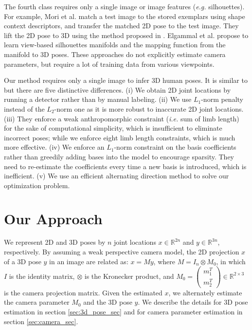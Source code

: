 \documentclass[10pt,twocolumn,letterpaper]{article}
\begin{document}
The fourth class \cite{mori2006recovering} \cite{elgammal2004inferring} requires only a single image or image features ({\it e.g.} silhouettes). For example, Mori et al. \cite{mori2006recovering} match a test image to the stored exemplars using shape context descriptors, and transfer the matched 2D pose to the test image. They lift the 2D pose to 3D using the method proposed in \cite{Taylor}. Elgammal et al.\cite{elgammal2004inferring} propose to learn view-based silhouettes manifolds and the mapping function from the manifold to 3D poses. These approaches do not explicitly estimate camera parameters, but require a lot of training data from various viewpoints.

Our method requires only a single image to infer 3D human poses. It is similar to \cite{Ramakrishna}
but there are five distinctive differences. (i) We obtain 2D
joint locations by running a detector \cite{Yang2D} rather
than by manual labeling. (ii) We use $L_1$-norm penalty instead
of the $L_2$-norm one as it is more robust to inaccurate 2D joint locations. (iii) They \cite{Ramakrishna} enforce a weak anthropomorphic constraint
({\em i.e.} sum of limb length) for the sake of computational
simplicity, which is insufficient to eliminate incorrect poses;
while we enforce eight limb length constraints, which is much more
effective. (iv) We enforce an
$L_1$-norm constraint on the basis coefficients rather than
greedily adding bases into the model to encourage sparsity. They
need to re-estimate the coefficients every time a new
basis is introduced, which is inefficient. (v) We use an efficient
alternating direction method to solve our optimization problem.



\section{Our Approach}
\label{sec:approach} We represent 2D and 3D poses by $n$ joint
locations $x \in \mathbb{R}^{2n}$ and $y \in \mathbb{R}^{3n}$,
respectively. By assuming a weak perspective camera model, the 2D projection $x$ of a 3D
pose $y$ in an image are related as: $x=M y$, where $M=I_{n}
\otimes M_0$, in which $I$ is the identity matrix, $\otimes$ is
the
Kronecker product, and $M_0= \begin{pmatrix} m_1^T\\
m_2^T
\end{pmatrix}
\in \mathbb{R}^{2 \times 3}$ is the camera projection matrix.
Given the estimated $x$, we alternately estimate the camera parameter
$M_0$ and the 3D pose $y$. We describe the details for 3D pose estimation in section \ref{sec:3d_pose_sec} and for camera parameter
estimation in section \ref{sec:camera_sec}.
\end{document}

